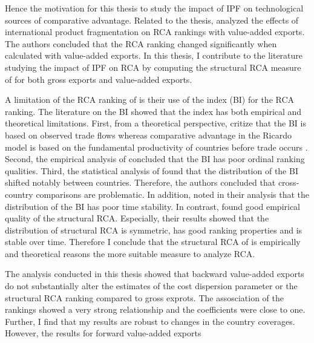  \par %
Hence the motivation for this thesis to study the impact of IPF on technological sources of comparative advantage.
 Related to the thesis, \textcite{Koopman} analyzed the effects of international product fragmentation on RCA rankings with  value-added
exports. The authors concluded that the RCA ranking changed significantly when calculated with value-added exports.
In this thesis, I contribute to the literature studying the impact of IPF on RCA  by computing the structural RCA measure of  \textcite{costinot} for both gross exports and value-added exports.
\par %
A limitation of the RCA ranking of  \textcite{Koopman} is their use of the \textcite{Balassa} index (BI) for the RCA ranking.
The literature on the BI showed that the index has both empirical and theoretical limitations.
 First, from a theoretical perspective,\textcite{Leromain} critize that the BI is based on observed trade flows whereas comparative advantage in the Ricardo model is based on the fundamental productivity of countries before trade occurs \parencite{Leromain}.  Second, the empirical analysis of \textcite{yeats} concluded that the BI has poor ordinal ranking qualities. Third, the statistical analysis of \textcite{hinloopen2001} found that the distribution of the BI shifted notably between countries. Therefore, the authors concluded
that cross-country comparisons are problematic.  In addition, \textcite{Leromain} noted in their analysis that the distribution of the BI has poor time stability.
In contrast,  \textcite{Leromain} found good empirical quality of the structural RCA.
 Especially, their results showed that the distribution of structural RCA is symmetric, has good ranking properties and is stable over time.
  Therefore I conclude that the structural RCA of \textcite{costinot} is empirically and theoretical reasons the more suitable measure to analyze RCA.    \par
The analysis conducted in this thesis showed that backward value-added exports do not substantially alter the estimates of the cost dispersion parameter or the structural RCA ranking compared to gross exprots.
The assosciation of the rankings showed a very strong relationship and the coefficients were close to one.
 Further, I find that my results are robust to changes in the country coverages. However, the results for forward value-added exports
